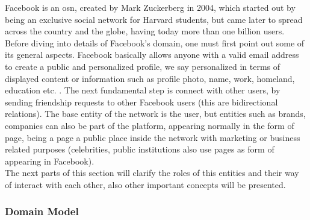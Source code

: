Facebook is an \gls{osn}, created by Mark Zuckerberg in 2004, which started out by being an exclusive social network for Harvard students, but came later to spread across
the country and the globe, having today more than one billion users.\\
\indent Before diving into details of Facebook's domain, one must first point out some of its general aspects. Facebook basically allows anyone with a valid email address to create a public and personalized profile,
we say personalized in terms of displayed content or information such as profile photo, name, work, homeland, education etc. .
The next fundamental step is connect with other users, by sending friendship requests to other Facebook users (this are bidirectional relations).
The base entity of the network is the user, but entities such as brands, companies can also be part of the platform, appearing normally
in the form of page, being a page a public place inside the network with marketing or business related purposes (celebrities, public institutions also use pages as form of appearing in Facebook).\\
\indent The next parts of this section will clarify the roles of this entities and their way of interact with each other, also other important concepts will be presented.

\subsubsection*{Domain Model}

